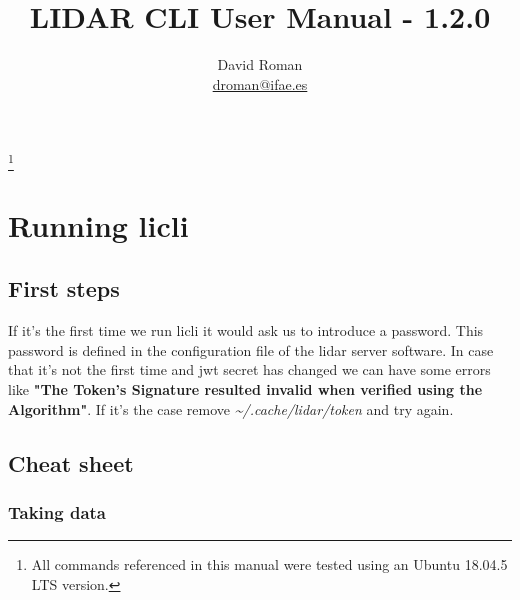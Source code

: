 \documentclass[letterpaper, 10 pt]{article}
\begin{document}
\title{LIDAR CLI User Manual - 1.2.0}
\author{David Roman \\  \href{mailto:droman@ifae.es}{droman@ifae.es} }
\maketitle
\footnote{All commands referenced in this manual were tested using an Ubuntu 18.04.5 LTS version. }
\pagestyle{empty}
\newpage
\tableofcontents
\newpage
{}
\pagestyle{plain}

\section{Running licli}
\subsection{First steps}
If it's the first time we run licli it would ask us to introduce a password. This password is defined in the configuration file of the lidar server software. 
In case that it's not the first time and jwt secret has changed we can have some errors like \textbf{"The Token's Signature resulted invalid when verified using the Algorithm"}. If it's the case remove \textit{\~{}/.cache/lidar/token} and try again.\\

\subsection{Cheat sheet}
\subsubsection{Taking data}
\end{document}
